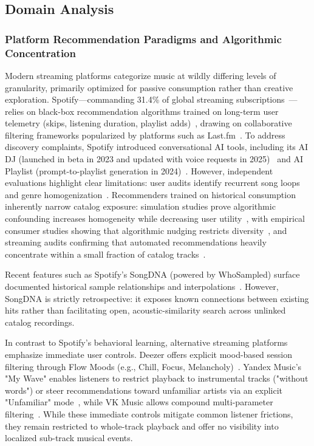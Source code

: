\subsection*{Domain Analysis}

\subsubsection*{Platform Recommendation Paradigms and Algorithmic Concentration}
Modern streaming platforms categorize music at wildly differing levels of granularity, primarily optimized for passive consumption rather than creative exploration. Spotify---commanding 31.4\% of global streaming subscriptions~\cite{ref:midia2026}---relies on black-box recommendation algorithms trained on long-term user telemetry (skips, listening duration, playlist adds)~\cite{ref:andersen2016}, drawing on collaborative filtering frameworks popularized by platforms such as Last.fm~\cite{ref:lastfm_data}. To address discovery complaints, Spotify introduced conversational AI tools, including its AI DJ (launched in beta in 2023 and updated with voice requests in 2025)~\cite{ref:digitalmusicnews2025_dj} and AI Playlist (prompt-to-playlist generation in 2024)~\cite{ref:techradar2025b_playlist}. However, independent evaluations highlight clear limitations: user audits identify recurrent song loops and genre homogenization~\cite{ref:techradar2025a_dj}. Recommenders trained on historical consumption inherently narrow catalog exposure: simulation studies prove algorithmic confounding increases homogeneity while decreasing user utility~\cite{ref:chaney2018, ref:anderson2022}, with empirical consumer studies showing that algorithmic nudging restricts diversity~\cite{ref:pnas2023}, and streaming audits confirming that automated recommendations heavily concentrate within a small fraction of catalog tracks~\cite{ref:baumann2024, ref:baracskay2022}.

Recent features such as Spotify's SongDNA (powered by WhoSampled) surface documented historical sample relationships and interpolations~\cite{ref:spotify_songdna_launch, ref:spotify_songdna_whosampled, ref:spotify_support_songdna}. However, SongDNA is strictly retrospective: it exposes known connections between existing hits rather than facilitating open, acoustic-similarity search across unlinked catalog recordings.

In contrast to Spotify's behavioral learning, alternative streaming platforms emphasize immediate user controls. Deezer offers explicit mood-based session filtering through Flow Moods (e.g., Chill, Focus, Melancholy)~\cite{ref:deezer2021_flow}. Yandex Music's "My Wave" enables listeners to restrict playback to instrumental tracks ("without words") or steer recommendations toward unfamiliar artists via an explicit "Unfamiliar" mode~\cite{ref:habr2023_yandex}, while VK Music allows compound multi-parameter filtering~\cite{ref:habr2025_vkmusic}. While these immediate controls mitigate common listener frictions, they remain restricted to whole-track playback and offer no visibility into localized sub-track musical events.

